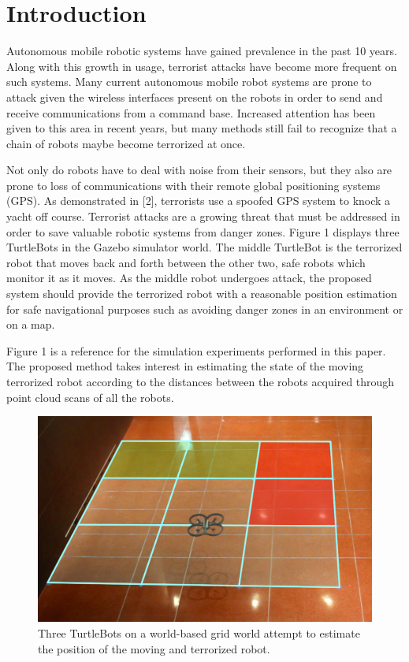 \documentclass[conference]{IEEEtran}
\begin{document}
\section{Introduction}
Autonomous mobile robotic systems have gained prevalence in the past 10 years. Along with this
growth in usage, terrorist attacks have become more frequent on such systems.
Many current autonomous mobile robot systems are prone to attack given the wireless interfaces present
on the robots in order to send and receive communications from a command base. Increased attention has
been given to this area in recent years, but many methods still fail to recognize that a chain of robots
maybe become terrorized at once.
\par
Not only do robots have to deal with noise from their sensors, but they also are prone to loss of communications
with their remote global positioning systems (GPS). As demonstrated in [2], terrorists use a spoofed GPS system
to knock a yacht off course. Terrorist attacks are a growing threat that must be addressed in order to save
valuable robotic systems from danger zones. Figure 1 displays three TurtleBots in the Gazebo simulator world. The middle TurtleBot is the terrorized robot that moves back and forth between the other two, safe robots which monitor it as it moves. As the middle robot undergoes attack, the proposed system should provide the terrorized robot with a reasonable position estimation for safe navigational purposes such as avoiding danger zones in an environment or on a map.
\par 
Figure 1 is a reference for the simulation experiments performed in this paper. The proposed method takes
interest in estimating the state of the moving terrorized robot according to the distances between the robots acquired through point cloud scans of all the robots.
\par
\begin{figure}[!ht]
  \centering
    \includegraphics[scale=.2]{figure1}
  \caption{Three TurtleBots on a world-based grid world attempt to estimate the position of the moving and terrorized robot.}
\end{figure}
\end{document}
